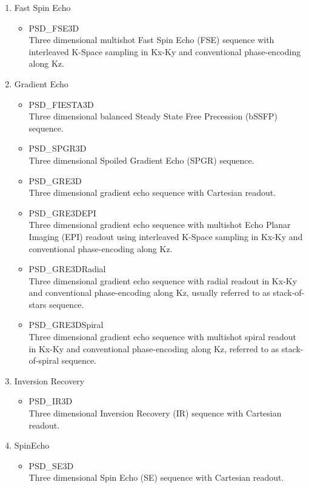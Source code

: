 \documentclass{book}%
\begin{document}
\begin{enumerate}
	\item Fast Spin Echo 
	
	\begin{itemize}
	\item PSD\_FSE3D \\
	Three dimensional multishot Fast Spin Echo (FSE) sequence with interleaved K-Space sampling in Kx-Ky and conventional phase-encoding along Kz. 
\end{itemize}

\item Gradient Echo

\begin{itemize}
	\item PSD\_FIESTA3D \\
	Three dimensional balanced Steady State Free Precession (bSSFP) sequence.
	\item PSD\_SPGR3D \\
	Three dimensional Spoiled Gradient Echo (SPGR) sequence.
	\item PSD\_GRE3D \\
	Three dimensional gradient echo sequence with Cartesian readout.
	\item PSD\_GRE3DEPI \\
	Three dimensional gradient echo sequence with multishot Echo Planar Imaging (EPI) readout using interleaved K-Space sampling in Kx-Ky and conventional phase-encoding along Kz. 
	\item PSD\_GRE3DRadial \\
	Three dimensional gradient echo sequence with radial readout in Kx-Ky and conventional phase-encoding along Kz, usually referred to as stack-of-stars sequence.
	\item PSD\_GRE3DSpiral \\
	Three dimensional gradient echo sequence with multishot spiral readout in Kx-Ky and conventional phase-encoding along Kz, referred to as stack-of-spiral sequence. 
\end{itemize}

\item Inversion Recovery
\begin{itemize}
	\item PSD\_IR3D \\
	Three dimensional Inversion Recovery (IR) sequence with Cartesian readout.
\end{itemize}

\item SpinEcho
\begin{itemize}
	\item PSD\_SE3D \\
	Three dimensional Spin Echo (SE) sequence with Cartesian readout.
\end{itemize}


\end{enumerate}
\end{document}
